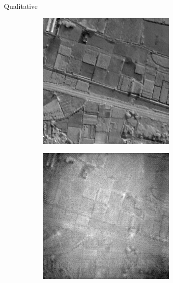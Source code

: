 \begin{frame}{Qualitative}
    \begin{figure}
        \centering
        \begin{subfigure}[b]{0.24\textwidth}
            \centering
            \includegraphics[width=\textwidth]{../figs/outputs/pan/71.png}
        \end{subfigure}
        \hfill
        \begin{subfigure}[b]{0.24\textwidth}
            \centering
            \includegraphics[width=\textwidth]{../figs/outputs/cut/71.png}

\end{subfigure}
\end{figure}
\end{frame}
